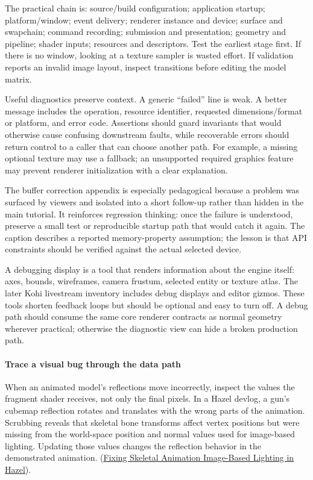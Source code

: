 The practical chain is: source/build configuration; application startup; platform/window; event delivery; renderer instance and device; surface and swapchain; command recording; submission and presentation; geometry and pipeline; shader inputs; resources and descriptors. Test the earliest stage first. If there is no window, looking at a texture sampler is wasted effort. If validation reports an invalid image layout, inspect transitions before editing the model matrix.

Useful diagnostics preserve context. A generic ``failed'' line is weak. A better message includes the operation, resource identifier, requested dimensions/format or platform, and error code. Assertions should guard invariants that would otherwise cause confusing downstream faults, while recoverable errors should return control to a caller that can choose another path. For example, a missing optional texture may use a fallback; an unsupported required graphics feature may prevent renderer initialization with a clear explanation.

The buffer correction appendix is especially pedagogical because a problem was surfaced by viewers and isolated into a short follow-up rather than hidden in the main tutorial. It reinforces regression thinking: once the failure is understood, preserve a small test or reproducible startup path that would catch it again. The caption describes a reported memory-property assumption; the lesson is that API constraints should be verified against the actual selected device.

A debugging display is a tool that renders information about the engine itself: axes, bounds, wireframes, camera frustum, selected entity or texture atlas. The later Kohi livestream inventory includes debug displays and editor gizmos. These tools shorten feedback loops but should be optional and easy to turn off. A debug path should consume the same core renderer contracts as normal geometry wherever practical; otherwise the diagnostic view can hide a broken production path.

\paragraph{Trace a visual bug through the data path}\label{trace-a-visual-bug-through-the-data-path}

When an animated model's reflections move incorrectly, inspect the values the fragment shader receives, not only the final pixels. In a Hazel devlog, a gun's cubemap reflection rotates and translates with the wrong parts of the animation. Scrubbing reveals that skeletal bone transforms affect vertex positions but were missing from the world-space position and normal values used for image-based lighting. Updating those values changes the reflection behavior in the demonstrated animation. (\href{https://www.youtube.com/watch?v=fs9ChRr4VHM&t=4m18s}{Fixing Skeletal Animation Image-Based Lighting in Hazel}).


